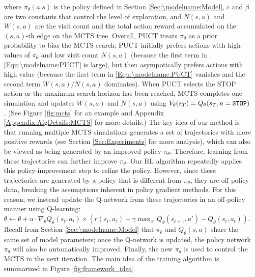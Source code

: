 \documentclass{article}
\begin{document}
	where $\pi_{\theta}(a|s)$ is the policy defined in Section \ref{Sec:\modelname:Model}, $c$ and $\beta$ are two constants that control the level of exploration, and $N(s,a)$ and $W(s,a)$ are the visit count and the total action reward accumulated on the $(s,a)$-th edge on the MCTS tree. Overall, PUCT treats $\pi_\theta$ as a prior probability to bias the MCTS search; PUCT initially prefers actions with high values of $\pi_{\theta}$ and low visit count $N(s,a)$ (because the first term in \eqref{Equ:\modelname:PUCT} is large), but then asympotically prefers actions with high value (because the first term in \eqref{Equ:\modelname:PUCT} vanishes and the second term $W(s,a)/N(s,a)$ dominates). When PUCT selects the STOP action or the maximum search horizon has been reached, MCTS completes one simulation and updates $W(s,a)$ and $N(s,a)$ using $V_{\theta}(s_T) = Q_{\theta}(s_T, a=\tt{STOP})$. (See Figure \ref{fig:mcts} for an example and Appendix \ref{Appendix:AlgDetails:MCTS} for more details.) The key idea of our method is that running multiple MCTS simulations generates a set of trajectories with more positive rewards (see Section \ref{Sec:Experiments} for more analysis), which can also be viewed as being generated by an improved policy $\pi_{\theta}$. Therefore, learning from these trajectories can further improve $\pi_{\theta}$. Our RL algorithm repeatedly applies this policy-improvement step to refine the policy. However, since these trajectories are generated by a policy that is different from $\pi_{\theta}$, they are off-policy data, breaking the assumptions inherent in policy gradient methods. For this reason, we instead update the Q-network from these trajectories in an off-policy manner using Q-learning: $\theta \leftarrow \theta  + \alpha \cdot \nabla_{\theta} Q_{\theta}(s_t,a_t) \times ( r(s_t,a_t) + \gamma \max_{a'} Q_{\theta}(s_{t+1},a') - Q_{\theta}(s_t,a_t) )$. Recall from Section \ref{Sec:\modelname:Model} that $\pi_{\theta}$ and $Q_{\theta}(s,a)$ share the same set of model parameters; once the Q-network is updated, the policy network $\pi_{\theta}$ will also be automatically improved. Finally, the new $\pi_{\theta}$ is used to control the MCTS in the next iteration. The main idea of the training algorithm is summarized in Figure \ref{fig:framework_idea}.
	
\end{document}
